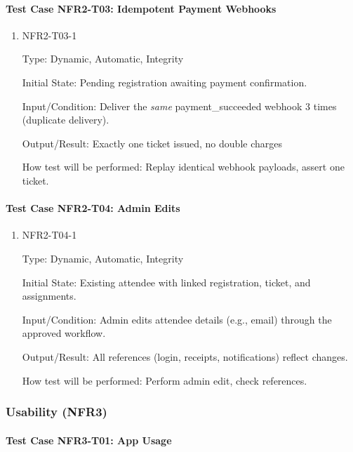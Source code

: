 \documentclass[12pt, titlepage]{article}
\begin{document}
\paragraph{Test Case NFR2-T03: Idempotent Payment Webhooks}

\begin{enumerate}
\item{NFR2-T03-1\\}

Type: Dynamic, Automatic, Integrity

Initial State: Pending registration awaiting payment confirmation.

Input/Condition: Deliver the \emph{same} payment\_succeeded webhook 3 times (duplicate delivery).

Output/Result: Exactly one ticket issued, no double charges

How test will be performed: Replay identical webhook payloads, assert one ticket.
\end{enumerate}

\paragraph{Test Case NFR2-T04: Admin Edits}

\begin{enumerate}
\item{NFR2-T04-1\\}

Type: Dynamic, Automatic, Integrity

Initial State: Existing attendee with linked registration, ticket, and assignments.

Input/Condition: Admin edits attendee details (e.g., email) through the approved workflow.

Output/Result: All references (login, receipts, notifications) reflect changes.

How test will be performed: Perform admin edit, check references.
\end{enumerate}

\subsubsection{Usability (NFR3)}

\paragraph{Test Case NFR3-T01: App Usage}
\end{document}
